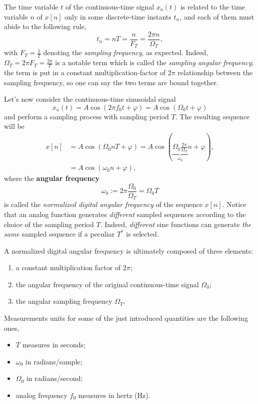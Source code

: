 \documentclass[\documentfontsize, twocolumn]{\classname}
\begin{document}
The time variable $t$ of the con\-ti\-nuo\-us-time signal $x_a(t)$ is related to the time variable $n$ of $x[n]$ only in some discrete-time instants $t_n$, and each of them must abide to the following rule,
\begin{equation}\label{eqn:timeSamplingRule}
    t_n = nT = \frac n {F_T} = \frac {2\pi n} {\Omega_T},
\end{equation}
with $F_T = \frac 1 T$ denoting the \emph{sampling frequency}, as expected. Indeed, $\Omega_T = 2\pi F_T = \frac{2\pi}{T}$ is a notable term which is called the \emph{sampling angular frequency}; the term is put in a constant multiplication-factor of $2\pi$ relationship between the sampling frequency, so one can say the two terms are bound together.

Let's now consider the con\-ti\-nuo\-us-time sinusoidal signal
\[
    x_a(t) = A\cos{(2\pi f_0 t + \varphi)} = A\cos{(\Omega_0 t + \varphi)}
\]
and perform a sampling process with sampling period $T$. 
The resulting se\-quen\-ce will be
\begin{align}
    x[n] &= A\cos{(\Omega_0 n T + \varphi)} = A\cos{(\underbrace{\Omega_0 \frac{2\pi}{\Omega_T}}_{\omega_0} n + \varphi)}, \\
         &= A\cos{(\omega_0 n + \varphi)},
\end{align}
where the \textbf{angular frequency} 
\[
    \omega_0 := 2 \pi \frac {\Omega_0} {\Omega_T} = \Omega_0 T
\]
is called the \emph{normalized digital angular frequency} of the se\-quen\-ce $x[n]$. Notice that an analog function generates \emph{different} sampled se\-quen\-ces according to the choice of the sampling period $T$. Indeed, \emph{different} sine functions can generate \emph{the same} sampled se\-quen\-ce if a peculiar $T^*$ is selected.

A normalized digital angular frequency is ultimately composed of three elements:
\begin{enumerate}
    \item a constant multiplication factor of $2\pi$;
    \item the angular frequency of the original continuous-time signal $\Omega_0$;
    \item the angular sampling frequency $\Omega_T$.
\end{enumerate}

Measurements units for some of the just introduced quantities are the following ones,
\begin{itemize}
    \item $T$ measures in seconds;
    \item $\omega_0$ in radians/sample;
    \item $\Omega_0$ in radians/second;
    \item analog frequency $f_0$ measures in hertz (Hz).
\end{itemize}
\end{document}
